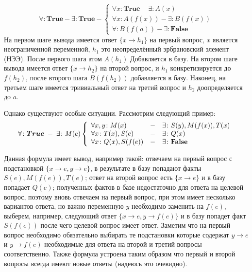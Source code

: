 \begin{equation}
	\forall\colon\boldsymbol{True} - \exists\colon\boldsymbol{True} - 
	\left\lbrace
	\begin{array}{l}
		\forall x\colon\boldsymbol{True} - \exists\colon A(x) \\
		\forall x\colon A(f(x)) - \exists\colon B(f(x)) \\
		\forall\colon B(f(a)) - \exists\colon \boldsymbol{False} 
	\end{array}\right.
\end{equation}
На первом шаге вывода имеется ответ $\{x \rightarrow h_1\}$ на первый вопрос, $x$ является неограниченной переменной, $h_1$ это неопределённый эрбрановский элемент (НЭЭ). После первого шага атом $A(h_1)$ Добавляется в базу. На втором шаге вывода имеется ответ $\{x \rightarrow h_2\}$ на второй вопрос, и $h_1$ конкретизируется до $f(h_2)$, после второго шага $B(f(h_2))$ добавляется в базу. Наконец, на третьем шаге имеется тривиальный ответ на третий вопрос и $h_2$ доопределяется до $a$.   

Однако существуют особые ситуации. Рассмотрим следующий пример:
$$\forall\colon\boldsymbol{True} \; - \; \exists\colon M(e) \left\{
\begin{array}{lcl}
 \forall x,y\colon M(x) & - & \exists\colon S(y),M(f(x)),T(x) \\
 \forall x \colon T(x),S(e) & - & \exists\colon Q(x) \\
 \forall x \colon Q(x),S(f(e)) & - & \exists\colon\textbf{False}
\end{array}
\right.$$

Данная формула имеет вывод, например такой: отвечаем на первый вопрос с подстановкой $\{ x\rightarrow e, y\rightarrow e \}$, в результате в базу попадают факты $S(e),M(f(e)),T(e)$; ответ на второй вопрос есть $\{ x \rightarrow e\}$ и в базу попадает $Q(e)$; полученных фактов в базе недостаточно для ответа на целевой вопрос, поэтому вновь отвечаем на первый вопрос, при этом имеет несколько вариантов ответа, но важно переменную $y$ необходимо заменить на $f(e)$, выберем, например, следующий ответ $\{x \rightarrow e, y \rightarrow f(e) \}$ и в базу попадет факт $S(f(e))$ после чего целевой вопрос имеет ответ. 
Заметим что на первый вопрос необходимо обязательно выбирать те подстановки которые содержат $y \rightarrow e$ и $y \rightarrow f(e)$ необходимые для ответа на второй и третий вопросы соответственно. Также формула устроена таким образом что первый и второй вопросы всегда имеют новые ответы (надеюсь это очевидно).

